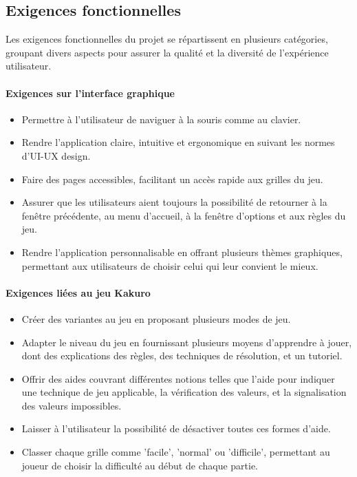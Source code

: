 \subsection{Exigences fonctionnelles}
Les exigences fonctionnelles du projet se répartissent en plusieurs catégories, groupant divers aspects pour assurer la qualité et la diversité de l'expérience utilisateur.

\paragraph{Exigences sur l'interface graphique}
\begin{itemize}
    \item Permettre à l'utilisateur de naviguer à la souris comme au clavier.
    \item Rendre l'application claire, intuitive et ergonomique en suivant les normes d'UI-UX design.
    \item Faire des pages accessibles, facilitant un accès rapide aux grilles du jeu.
    \item Assurer que les utilisateurs aient toujours la possibilité de retourner à la fenêtre précédente, au menu d'accueil, à la fenêtre d'options et aux règles du jeu.
    \item Rendre l'application personnalisable en offrant plusieurs thèmes graphiques, permettant aux utilisateurs de choisir celui qui leur convient le mieux.
\end{itemize}

\paragraph{Exigences liées au jeu Kakuro}
\begin{itemize}
    \item Créer des variantes au jeu en proposant plusieurs modes de jeu.
    \item Adapter le niveau du jeu en fournissant plusieurs moyens d'apprendre à jouer, dont des explications des règles, des techniques de résolution, et un tutoriel.
    \item Offrir des aides couvrant différentes notions telles que l'aide pour indiquer une technique de jeu applicable, la vérification des valeurs, et la signalisation des valeurs impossibles.
    \item Laisser à l'utilisateur la possibilité de désactiver toutes ces formes d'aide.
    \item Classer chaque grille comme 'facile', 'normal' ou 'difficile', permettant au joueur de choisir la difficulté au début de chaque partie.
\end{itemize}

